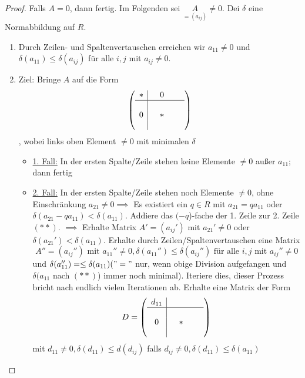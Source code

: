 \documentclass[a4paper, titlepage]{article}
\theoremstyle{definition}
\begin{document}
\begin{proof}
Falls $A=0$, dann fertig. Im Folgenden sei $\underset{=(a_{ij})}{A}\neq 0$. Dei $\delta$ eine Normabbildung auf $R$.
\begin{enumerate}
\item Durch Zeilen- und Spaltenvertauschen erreichen wir $a_{11}\neq 0$ und $\delta(a_{11})\leq \delta(a_{ij})$ für alle $i,j$ mit $a_{ij}\neq 0$.
\item Ziel: Bringe $A$ auf die Form 
$$\left(\begin{array}{c|cccc}
    \ast& &0 & & \\
    \hline& & & &  \\  
    0& & \ast & \\
    & & & & \\
\end{array}\right)$$, wobei links oben Element $\neq 0$ mit minimalen $\delta$ 
\begin{itemize}
    \item \underline{1. Fall:} In der ersten Spalte/Zeile stehen keine Elemente $\neq 0$ außer $a_{11}; $ dann fertig
    \item \underline{2. Fall:} In der ersten Spalte/Zeile stehen noch Elemente $\neq 0$, ohne Einschränkung $a_{21}\neq 0\implies $ Es existiert ein $q\in R$ mit $a_{21}=qa_{11} $ oder $\delta(a_{21}-qa_{11})<\delta(a_{11}). $ Addiere das $(-q$)-fache der 1. Zeile zur 2. Zeile $(\ast\ast)$. $\implies $ Erhalte Matrix $A'=(a_{ij}')$ mit $a_{21}'\neq 0$ oder $\delta(a_{21}')<\delta(a_{11})$. Erhalte durch Zeilen/Spaltenvertauschen eine Matrix 
        $$A''=(a_{ij}'') \text{ mit } a_{11}''\neq 0, \delta(a_{11}'')\leq \delta(a_{ij}'')\text{ für alle } i,j  \text{ mit } a_{ij}''\neq 0$$
        und  $\delta(a_{11}'')=\leq \delta(a_{11})("="$ nur, wenn obige Division aufgefangen und $\delta(a_{11}$ nach $(\ast\ast)$) immer noch minimal). Iteriere dies, dieser Prozess bricht nach endlich vielen Iterationen ab.
        Erhalte eine Matrix der Form 
        $$D= \left(\begin{array}{c|cccc}
            d_{11}& & & & \\
            \hline& & & &  \\  
            0& & \ast& & \\
            & & & & \\
        \end{array}\right)$$ 
        mit $d_{11}\neq 0,\delta(d_{11})\leq d(d_{ij})$ falls $ d_{ij}\neq 0, \delta(d_{11})\leq \delta(a_{11})$
    \end{itemize}

\end{enumerate}
\end{proof}
\end{document}
